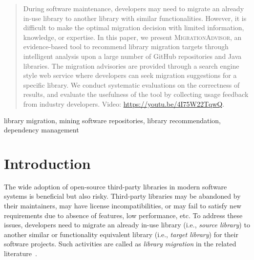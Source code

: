 \documentclass[conference,10pt]{IEEEtran}
\begin{document}
\maketitle

\begingroup\renewcommand\thefootnote{\textsection}
\endgroup

\begin{abstract}
During software maintenance, developers may need to migrate an already in-use library to another library with similar functionalities.
However, it is difficult to make the optimal migration decision with limited information, knowledge, or expertise. 
In this paper, we present \textsc{MigrationAdvisor}, an evidence-based tool to recommend library migration targets through intelligent analysis upon a large number of GitHub repositories and Java libraries. 
The migration advisories are provided through a search engine style web service where developers can seek migration suggestions for a specific library.
We conduct systematic evaluations on the correctness of results, and evaluate the usefulness of the tool by collecting usage feedback from industry developers.
Video:  \url{https://youtu.be/4I75W22TqwQ}.
\end{abstract}

\begin{IEEEkeywords}
library migration, mining software repositories, library recommendation, dependency management
\end{IEEEkeywords}

\section{Introduction}

The wide adoption of open-source third-party libraries in modern software systems is beneficial but also risky. 
Third-party libraries may be abandoned by their maintainers, may have license incompatibilities, or may fail to satisfy new requirements due to absence of features, low performance, etc.
To address these issues, developers need to migrate an already in-use library (i.e., \textit{source library}) to another similar or functionality equivalent library (i.e., \textit{target library}) for their software projects. Such activities are called as \textit{library migration} in the related literature~\cite{teyton2012mining, teyton2014study, kabinna2016logging, alrubaye2019migrationminer}.
\end{document}
